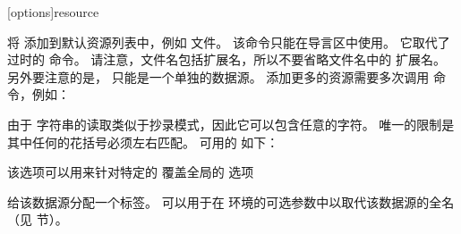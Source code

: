 \begin{ltxsyntax}

[options]{resource}


将  添加到默认资源列表中，例如  文件。
该命令只能在导言区中使用。
它取代了过时的  命令。
请注意，文件名包括扩展名，所以不要省略文件名中的  扩展名。
另外要注意的是， 只能是一个单独的数据源。
添加更多的资源需要多次调用  命令，例如：
\begin{ltxexample}




\end{ltxexample}
%
由于  字符串的读取类似于抄录模式，因此它可以包含任意的字符。
唯一的限制是其中任何的花括号必须左右匹配。
可用的  如下：

\begin{optionlist*}



该选项可以用来针对特定的  覆盖全局的 选项



给该数据源分配一个标签。
 可以用于在  环境的可选参数中以取代该数据源的全名
（见  节）。



\end{optionlist*}
\end{ltxsyntax}
